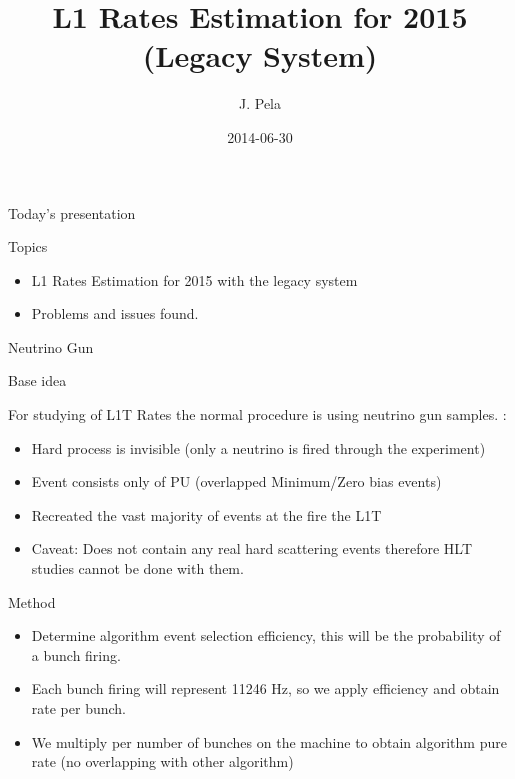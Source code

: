 \documentclass[8pt]{beamer}
\author[J. Pela]{J. Pela}
\title{L1 Rates Estimation for 2015 (Legacy System)}
\institute[ICL]{Imperial College London}
\date{2014-06-30}
\begin{document}
\setlength{\unitlength}{1mm}

\begin{frame}
  \titlepage
\end{frame}

\begin{frame}{Today's presentation}
 
\begin{block}{Topics}
 
\begin{itemize}
  \item L1 Rates Estimation for 2015 with the legacy system
  \item Problems and issues found.
\end{itemize}

\end{block}

\end{frame}

\begin{frame}{Neutrino Gun}

\begin{block}{Base idea}
 
For studying of L1T Rates the normal procedure is using neutrino gun samples. :
\begin{itemize}
 \item Hard process is invisible (only a neutrino is fired through the experiment)
 \item Event consists only of PU (overlapped Minimum/Zero bias events)
 \item Recreated the vast majority of events at the fire the L1T
 \item Caveat: Does not contain any real hard scattering events therefore HLT studies cannot be done with them.
\end{itemize}

\end{block}

\begin{block}{Method}
 
\begin{itemize}
 \item Determine algorithm event selection efficiency, this will be the probability of a bunch firing.
 \item Each bunch firing will represent 11246 Hz, so we apply efficiency and obtain rate per bunch.
 \item We multiply per number of bunches on the machine to obtain algorithm pure rate (no overlapping with other algorithm)
\end{itemize}
 
\end{block}

\end{frame}
                                                                                                                              
\end{document}
